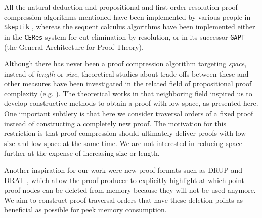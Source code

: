 All the natural deduction and propositional and first-order resolution proof compression algorithms mentioned have been implemented by various people in \texttt{Skeptik} \cite{Boudou2014}, whereas the sequent calculus algorithms have been implemented either in the \texttt{CERes} system \cite{DBLP:conf/cade/DunchevLLWP10} for cut-elimination by resolution, or in its successor \texttt{GAPT} \cite{GAPT} (the General Architecture for Proof Theory).

Although there has never been a proof compression algorithm targeting \emph{space}, instead of \emph{length} or \emph{size}, theoretical studies about trade-offs between these and other measures have been investigated in the related field of propositional proof complexity (e.g. \cite{Ben-Sasson2002}). The theoretical works in that neighboring field inspired us to develop constructive methods to obtain a proof with low space, as presented here. One important subtlety is that here we consider traversal orders of a fixed proof instead of constructing a completely new proof. The motivation for this restriction is that proof compression should ultimately deliver proofs with low size and low space at the same time. We are not interested in reducing space further at the expense of increasing size or length.

Another inspiration for our work were new proof formats such as DRUP \cite{DRUP} and DRAT \cite{raey}, which allow the proof producer to explicitly highlight at which point proof nodes can be deleted from memory because they will not be used anymore. We aim to construct proof traversal orders that have these deletion points as beneficial as possible for peek memory consumption.
